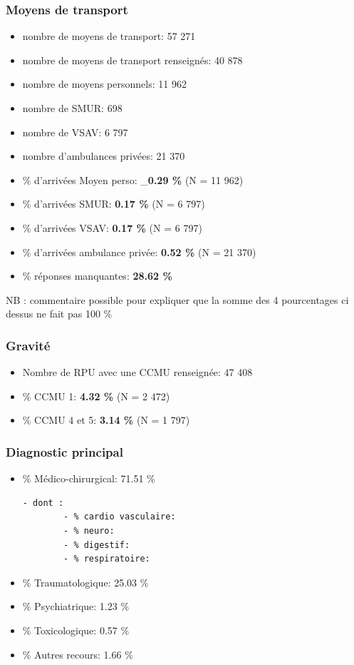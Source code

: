 \documentclass[]{article}
\begin{document}
\subsubsection{Moyens de transport}\label{moyens-de-transport}

\begin{itemize}
\item
  nombre de moyens de transport: 57 271
\item
  nombre de moyens de transport renseignés: 40 878
\item
  nombre de moyens personnels: 11 962
\item
  nombre de SMUR: 698
\item
  nombre de VSAV: 6 797
\item
  nombre d'ambulances privées: 21 370
\item
  \% d'arrivées Moyen perso: \_\textbf{0.29 \%} (N = 11 962)
\item
  \% d'arrivées SMUR: \textbf{0.17 \%} (N = 6 797)
\item
  \% d'arrivées VSAV: \textbf{0.17 \%} (N = 6 797)
\item
  \% d'arrivées ambulance privée: \textbf{0.52 \%} (N = 21 370)
\item
  \% réponses manquantes: \textbf{28.62 \%}
\end{itemize}

NB : commentaire possible pour expliquer que la somme des 4 pourcentages
ci dessus ne fait pas 100 \%

\subsubsection{Gravité}\label{gravite}

\begin{itemize}
\itemsep1pt\parskip0pt
\item
  Nombre de RPU avec une CCMU renseignée: 47 408
\item
  \% CCMU 1: \textbf{4.32 \%} (N = 2 472)
\item
  \% CCMU 4 et 5: \textbf{3.14 \%} (N = 1 797)
\end{itemize}

\subsubsection{Diagnostic principal}\label{diagnostic-principal-1}

\begin{itemize}
\item
  \% Médico-chirurgical: 71.51 \%

\begin{verbatim}
- dont :
        - % cardio vasculaire:
        - % neuro:
        - % digestif:
        - % respiratoire:
\end{verbatim}
\item
  \% Traumatologique: 25.03 \%
\item
  \% Psychiatrique: 1.23 \%
\item
  \% Toxicologique: 0.57 \%
\item
  \% Autres recours: 1.66 \%
\end{itemize}
\end{document}
